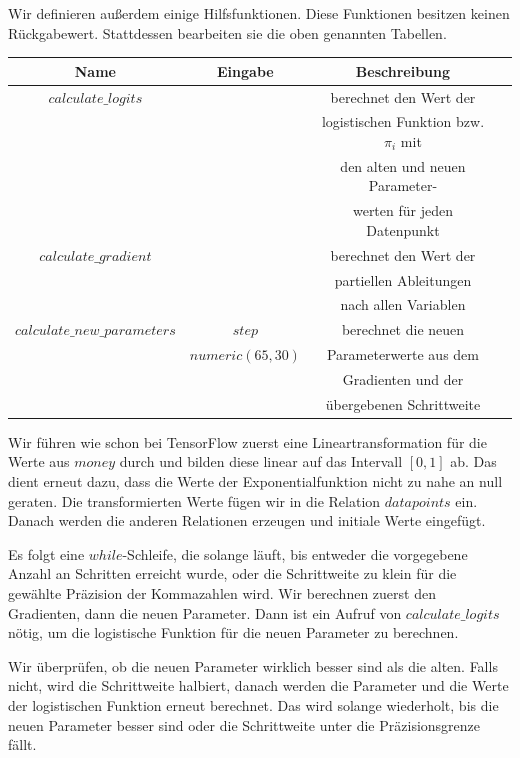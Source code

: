 Wir definieren außerdem einige Hilfsfunktionen. Diese Funktionen besitzen keinen Rückgabewert. Stattdessen bearbeiten sie die oben genannten Tabellen.
\begin{center}
  \begin{tabular}{|c|c|c|c|}\hline
    \textbf{Name} & \textbf{Eingabe} & \textbf{Beschreibung} \\ \hline
    $calculate\_logits$ & & berechnet den Wert der \\
    & & logistischen Funktion bzw. $\pi_i$ mit \\
    & & den alten und neuen Parameter- \\
    & & werten für jeden Datenpunkt \\ \hline
    $calculate\_gradient$ & & berechnet den Wert der \\
    & & partiellen Ableitungen \\
    & & nach allen Variablen \\ \hline
    $calculate\_new\_parameters$ & $step$ & berechnet die neuen \\
    & $numeric(65, 30)$ & Parameterwerte aus dem \\
    & & Gradienten und der \\
    & & übergebenen Schrittweite \\ \hline
  \end{tabular}
\end{center}

Wir führen wie schon bei TensorFlow zuerst eine Lineartransformation für die Werte aus $money$ durch und bilden diese linear auf das Intervall $[0, 1]$ ab. Das dient erneut dazu, dass die Werte der Exponentialfunktion nicht zu nahe an null geraten. Die transformierten Werte fügen wir in die Relation $datapoints$ ein. Danach werden die anderen Relationen erzeugen und initiale Werte eingefügt.

Es folgt eine $while$-Schleife, die solange läuft, bis entweder die vorgegebene Anzahl an Schritten erreicht wurde, oder die Schrittweite zu klein für die gewählte Präzision der Kommazahlen wird. Wir berechnen zuerst den Gradienten, dann die neuen Parameter. Dann ist ein Aufruf von $calculate\_logits$ nötig, um die logistische Funktion für die neuen Parameter zu berechnen.

Wir überprüfen, ob die neuen Parameter wirklich besser sind als die alten. Falls nicht, wird die Schrittweite halbiert, danach werden die Parameter und die Werte der logistischen Funktion erneut berechnet. Das wird solange wiederholt, bis die neuen Parameter besser sind oder die Schrittweite unter die Präzisionsgrenze fällt.

